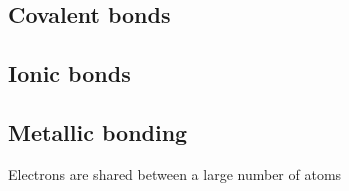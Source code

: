 
\subsection{Covalent bonds}

\subsection{Ionic bonds}

\subsection{Metallic bonding}
Electrons are shared between a large number of atoms
